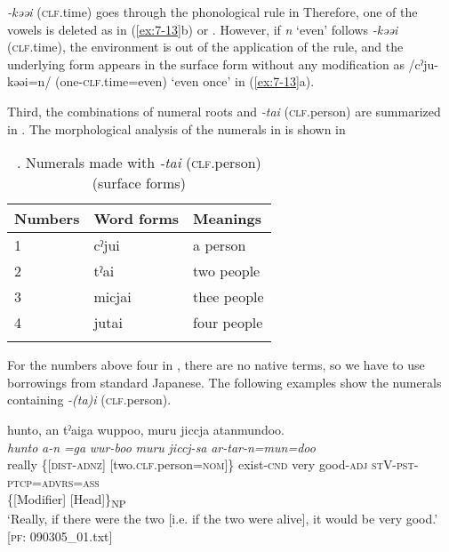 \textit{{}-kəəi} (\textsc{clf}.time) goes through the phonological rule in  Therefore, one of the vowels is deleted as in (\ref{ex:7-13}b) or . However, if \textit{n} ‘even’ follows \textit{{}-kəəi} (\textsc{clf}.time), the environment is out of the application of the rule, and the underlying form appears in the surface form without any modification as /cˀju-kəəi=n/ (one-\textsc{clf}.time=even) ‘even once’ in (\ref{ex:7-13}a).

Third, the combinations of numeral roots and \textit{{}-tai} (\textsc{clf}.person) are summarized in . The morphological analysis of the numerals in  is shown in 

\begin{table}
\caption{\label{tab:key:49}. Numerals made with \textit{-tai} (\textsc{clf}.person) (surface forms)}
\begin{tabular}{lll}
\lsptoprule
Numbers  & Word forms  & Meanings\\
\midrule
1&  cˀjui & a person      \\
2&  tˀai  &two people     \\
3&  micjai&  thee people  \\
4&  jutai & four people   \\
\lspbottomrule
\end{tabular}
\end{table}

For the numbers above four in , there are no native terms, so we have to use borrowings from standard Japanese. The following examples show the numerals containing \textit{{}-(ta)i} (\textsc{clf}.person).

\ea \label{ex:7:14}
\ea \label{ex:7:14a}
{\TM}
\gllll  hunto,  an  tˀaiga  wuppoo,  muru   jiccja  atanmundoo.\\
\textit{hunto}  \textit{a-n}  \textit{=ga}  \textit{wur-boo}  \textit{muru}  \textit{jiccj-sa}  \textit{ar-tar-n=mun=doo}\\
really  \{[\textsc{dist}-\textsc{adnz}]  [two.\textsc{clf}.person=\textsc{nom}]\}  exist-\textsc{cnd}  very   good-\textsc{adj}  \textsc{st}V-\textsc{pst}-\textsc{ptcp}=\textsc{advrs}=\textsc{ass}\\
\{[Modifier]  [Head]\}\textsubscript{NP}    \\
\glt ‘Really, if there were the two [i.e. if the two were alive], it would be very good.’ [\textsc{pf}: 090305\_01.txt]

